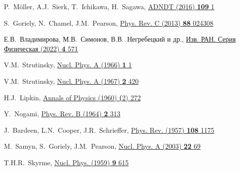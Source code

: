 \begin{thebibliography}{9}
P.~Möller, A.J.~Sierk, T.~Ichikawa, H.~Sagawa,
\href{https://doi.org/10.1016/j.adt.2015.10.002}
  {ADNDT (2016) \textbf{109} 1}

S.~Goriely, N.~Chamel, J.M.~Pearson,
\href{https://doi.org/10.1103/PhysRevC.88.024308}
  {Phys. Rev. C (2013) \textbf{88} 024308}

Е.В.~Владимирова, М.В.~Симонов, В.В.~Негребецкий и др.,
\href{https://doi.org/10.31857/S0367676522040263}
  {Изв. РАН. Серия Физическая (2022) \textbf{4} 571}

V.M.~Strutinsky,
\href{https://doi.org/10.1016/0375-9474(68)90699-4}
  {Nucl. Phys. A (1966) \textbf{1} 1}

V.M.~Strutinsky,
\href{https://doi.org/10.1016/0375-9474(67)90510-6}
  {Nucl. Phys. A (1967) \textbf{2} 420}

H.J.~Lipkin,
\href{https://doi.org/10.1016/0003-4916(60)90032-4}
  {Annals of Physics (1960) \textbf(2) 272}

Y.~Nogami,
\href{https://doi.org/10.1103/PhysRev.134.B313}
  {Phys. Rev. B (1964) \textbf{2} 313}

J.~Bardeen, L.N.~Cooper, J.R.~Schrieffer,
\href{https://doi.org/10.1103/PhysRev.108.1175}
  {Phys. Rev. (1957) \textbf{108} 1175}

M.~Samyn, S.~Goriely, J.M.~Pearson,
\href{https://doi.org/10.1016/S0375-9474(03)01578-1}
  {Nucl. Phys. A (2003) \textbf{22} 69}

T.H.R.~Skyrme,
\href{https://doi.org/10.1016/0029-5582(58)90345-6}
  {Nucl. Phys. (1959) \textbf{9} 615}
 

\end{thebibliography}
